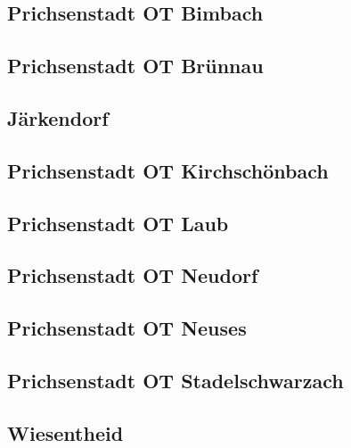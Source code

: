 \documentclass[fontsize=12pt,a4paper]{scrreprt}
\begin{document}
\subsection{Prichsenstadt OT Bimbach}


\subsection{Prichsenstadt OT Brünnau}


\subsection{Järkendorf}


\subsection{Prichsenstadt OT Kirchschönbach}


\subsection{Prichsenstadt OT Laub}


\subsection{Prichsenstadt OT Neudorf}


\subsection{Prichsenstadt OT Neuses}


\subsection{Prichsenstadt OT Stadelschwarzach}


\subsection{Wiesentheid}

\end{document}

